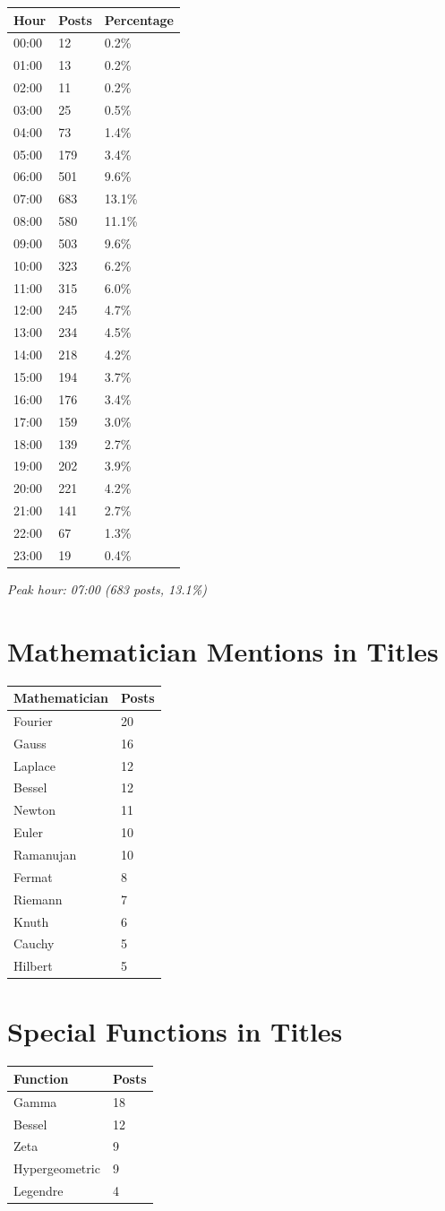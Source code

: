 \begin{longtable}{p{3.00cm}p{3.00cm}p{3.00cm}}
\toprule
\textbf{Hour} & \textbf{Posts} & \textbf{Percentage} \tabularnewline
\midrule
00:00 & 12 & 0.2\% \tabularnewline
01:00 & 13 & 0.2\% \tabularnewline
02:00 & 11 & 0.2\% \tabularnewline
03:00 & 25 & 0.5\% \tabularnewline
04:00 & 73 & 1.4\% \tabularnewline
05:00 & 179 & 3.4\% \tabularnewline
06:00 & 501 & 9.6\% \tabularnewline
07:00 & 683 & 13.1\% \tabularnewline
08:00 & 580 & 11.1\% \tabularnewline
09:00 & 503 & 9.6\% \tabularnewline
10:00 & 323 & 6.2\% \tabularnewline
11:00 & 315 & 6.0\% \tabularnewline
12:00 & 245 & 4.7\% \tabularnewline
13:00 & 234 & 4.5\% \tabularnewline
14:00 & 218 & 4.2\% \tabularnewline
15:00 & 194 & 3.7\% \tabularnewline
16:00 & 176 & 3.4\% \tabularnewline
17:00 & 159 & 3.0\% \tabularnewline
18:00 & 139 & 2.7\% \tabularnewline
19:00 & 202 & 3.9\% \tabularnewline
20:00 & 221 & 4.2\% \tabularnewline
21:00 & 141 & 2.7\% \tabularnewline
22:00 & 67 & 1.3\% \tabularnewline
23:00 & 19 & 0.4\% \tabularnewline
\bottomrule
\end{longtable}

\textit{Peak hour: 07:00 (683 posts, 13.1\%)}


\bigskip

\section*{Mathematician Mentions in Titles}

\begin{longtable}{l p{5.5cm}}
\toprule
\textbf{Mathematician} & \textbf{Posts} \tabularnewline
\midrule
Fourier & 20 \tabularnewline
Gauss & 16 \tabularnewline
Laplace & 12 \tabularnewline
Bessel & 12 \tabularnewline
Newton & 11 \tabularnewline
Euler & 10 \tabularnewline
Ramanujan & 10 \tabularnewline
Fermat & 8 \tabularnewline
Riemann & 7 \tabularnewline
Knuth & 6 \tabularnewline
Cauchy & 5 \tabularnewline
Hilbert & 5 \tabularnewline
\bottomrule
\end{longtable}

\bigskip

\section*{Special Functions in Titles}

\begin{longtable}{l p{5.5cm}}
\toprule
\textbf{Function} & \textbf{Posts} \tabularnewline
\midrule
Gamma & 18 \tabularnewline
Bessel & 12 \tabularnewline
Zeta & 9 \tabularnewline
Hypergeometric & 9 \tabularnewline
Legendre & 4 \tabularnewline
\bottomrule
\end{longtable}

